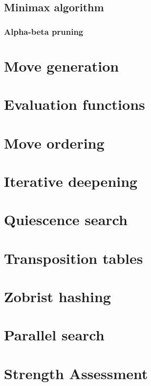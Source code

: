 \subsection{Minimax algorithm}

\subsubsection{Alpha-beta pruning}

\section{Move generation}

\section{Evaluation functions}

\section{Move ordering}

\section{Iterative deepening}

\section{Quiescence search}

\section{Transposition tables}

\section{Zobrist hashing}

\section{Parallel search}

\section{Strength Assessment}


